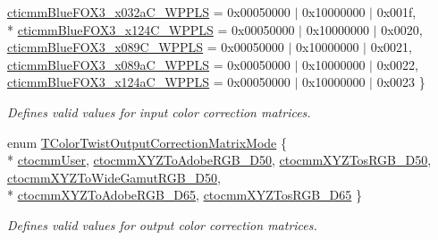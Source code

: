 \begin{DoxyCompactItemize}
\hyperlink{group___common_interface_gga514bdc683ef27995fdeba04aec25f571a4cf22b2055d24cc0b02b5e3d4104ed1a}{cticmm\+Blue\+F\+O\+X3\+\_\+x032a\+C\+\_\+\+W\+P\+P\+L\+S} = 0x00050000 $\vert$ 0x10000000 $\vert$ 0x001f, 
\\*
\hyperlink{group___common_interface_gga514bdc683ef27995fdeba04aec25f571a5b0030c0cbf921224f26f671b77ba530}{cticmm\+Blue\+F\+O\+X3\+\_\+x124\+C\+\_\+\+W\+P\+P\+L\+S} = 0x00050000 $\vert$ 0x10000000 $\vert$ 0x0020, 
\hyperlink{group___common_interface_gga514bdc683ef27995fdeba04aec25f571a4a387aafd6c1a901330d28c4541fa9d5}{cticmm\+Blue\+F\+O\+X3\+\_\+x089\+C\+\_\+\+W\+P\+P\+L\+S} = 0x00050000 $\vert$ 0x10000000 $\vert$ 0x0021, 
\hyperlink{group___common_interface_gga514bdc683ef27995fdeba04aec25f571ab48e75f90964aa9ee719a5bb38ad57bb}{cticmm\+Blue\+F\+O\+X3\+\_\+x089a\+C\+\_\+\+W\+P\+P\+L\+S} = 0x00050000 $\vert$ 0x10000000 $\vert$ 0x0022, 
\hyperlink{group___common_interface_gga514bdc683ef27995fdeba04aec25f571ad62d57214ee87cfbe904b66b9e1cab29}{cticmm\+Blue\+F\+O\+X3\+\_\+x124a\+C\+\_\+\+W\+P\+P\+L\+S} = 0x00050000 $\vert$ 0x10000000 $\vert$ 0x0023
 \}
\begin{DoxyCompactList}\small\item\em Defines valid values for input color correction matrices. \end{DoxyCompactList}\item 
enum \hyperlink{group___common_interface_ga0892ed0e7e5949707e49bb7d584f8478}{T\+Color\+Twist\+Output\+Correction\+Matrix\+Mode} \{ \\*
\hyperlink{group___common_interface_gga0892ed0e7e5949707e49bb7d584f8478aff328ac49272146c46afe22eda5af233}{ctocmm\+User}, 
\hyperlink{group___common_interface_gga0892ed0e7e5949707e49bb7d584f8478a1dc4d7bd21fe0ff9dadc06e4f58b5f04}{ctocmm\+X\+Y\+Z\+To\+Adobe\+R\+G\+B\+\_\+\+D50}, 
\hyperlink{group___common_interface_gga0892ed0e7e5949707e49bb7d584f8478a6f0faa342b42f2e3ee9edf91a0cb1cbf}{ctocmm\+X\+Y\+Z\+Tos\+R\+G\+B\+\_\+\+D50}, 
\hyperlink{group___common_interface_gga0892ed0e7e5949707e49bb7d584f8478a7c8be4599e35eb7af44bfa502dadcd71}{ctocmm\+X\+Y\+Z\+To\+Wide\+Gamut\+R\+G\+B\+\_\+\+D50}, 
\\*
\hyperlink{group___common_interface_gga0892ed0e7e5949707e49bb7d584f8478a8b44b475361ac45ed09a9b9fe922df76}{ctocmm\+X\+Y\+Z\+To\+Adobe\+R\+G\+B\+\_\+\+D65}, 
\hyperlink{group___common_interface_gga0892ed0e7e5949707e49bb7d584f8478aca5b58dce7183dab8dc5c2bf07f44fa5}{ctocmm\+X\+Y\+Z\+Tos\+R\+G\+B\+\_\+\+D65}
 \}
\begin{DoxyCompactList}\small\item\em Defines valid values for output color correction matrices. \end{DoxyCompactList}\item 

\end{DoxyCompactItemize}
